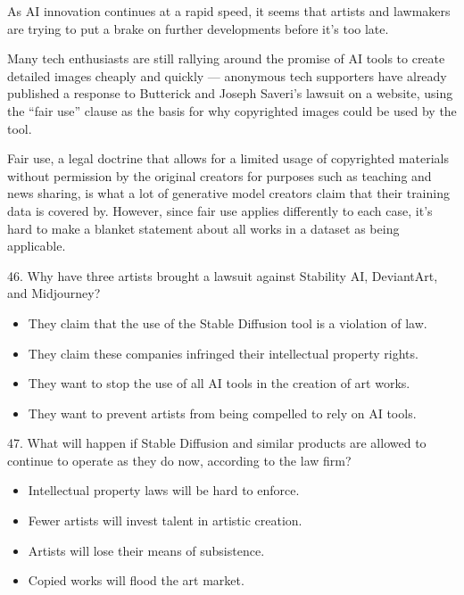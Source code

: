 \documentclass[UTF8,11pt]{ctexart}
\begin{document}
As AI innovation continues at a rapid speed, it seems that artists and lawmakers are trying to put a brake on further developments before it’s too late.


Many tech enthusiasts are still rallying around the promise of AI tools to create detailed images cheaply and quickly — anonymous tech supporters have already published a response to Butterick and Joseph Saveri’s lawsuit on a website, using the “fair use” clause as the basis for why copyrighted images could be used by the tool.


Fair use, a legal doctrine that allows for a limited usage of copyrighted materials without permission by the original creators for purposes such as teaching and news sharing, is what a lot of generative model creators claim that their training data is covered by. However, since fair use applies differently to each case, it’s hard to make a blanket statement about all works in a dataset as being applicable.


46. Why have three artists brought a lawsuit against Stability AI, DeviantArt, and Midjourney?


\begin{itemize}[leftmargin=2em,itemsep=.2em,topsep=.4em]\item[A.] They claim that the use of the Stable Diffusion tool is a violation of law.
\item[B.] They claim these companies infringed their intellectual property rights.
\item[C.] They want to stop the use of all AI tools in the creation of art works.
\item[D.] They want to prevent artists from being compelled to rely on AI tools.
\end{itemize}

47. What will happen if Stable Diffusion and similar products are allowed to continue to operate as they do now, according to the law firm?


\begin{itemize}[leftmargin=2em,itemsep=.2em,topsep=.4em]\item[A.] Intellectual property laws will be hard to enforce.
\item[B.] Fewer artists will invest talent in artistic creation.
\item[C.] Artists will lose their means of subsistence.
\item[D.] Copied works will flood the art market.
\end{itemize}
\end{document}
